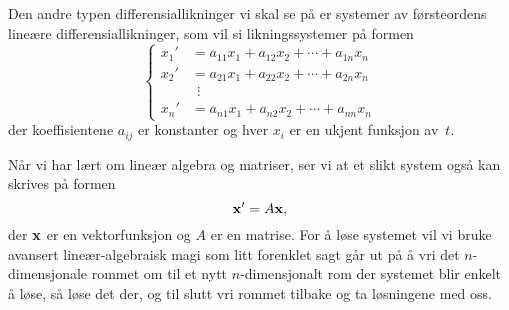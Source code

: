 Den andre typen differensiallikninger vi skal se på er systemer av
førsteordens lineære differensiallikninger, som vil si
likningssystemer på formen
\[
\left\{
\begin{aligned}
x_1' &= a_{11} x_1 + a_{12} x_2 + \cdots + a_{1n} x_n \\
x_2' &= a_{21} x_1 + a_{22} x_2 + \cdots + a_{2n} x_n \\
     &\ \ \vdots \\
x_n' &= a_{n1} x_1 + a_{n2} x_2 + \cdots + a_{nn} x_n
\end{aligned}
\right.
\]
der koeffisientene $a_{ij}$ er konstanter og hver $x_i$ er en ukjent
funksjon av~$t$.

Når vi har lært om lineær algebra og matriser, ser vi at et slikt
system også kan skrives på formen
\[
\mathbf{x}' = A \mathbf{x},
\]
der $\mathbf{x}$ er en vektorfunksjon og $A$ er en matrise.  For å løse
systemet vil vi bruke avansert lineær-algebraisk magi som litt
forenklet sagt går ut på å vri det $n$-dimensjonale rommet om til et
nytt $n$-dimensjonalt rom der systemet blir enkelt å løse, så løse det
der, og til slutt vri rommet tilbake og ta løsningene med oss.



